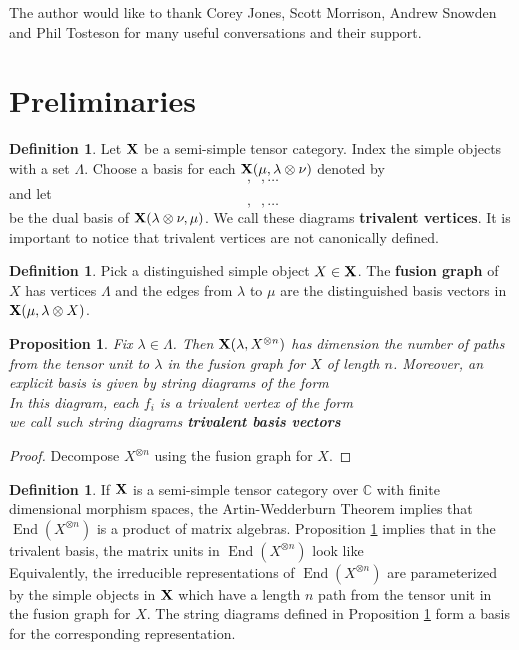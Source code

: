 \documentclass[12pt]{amsart}
\theoremstyle{plain}
\newtheorem{Proposition}[Theorem]{Proposition}
\theoremstyle{definition}
\newtheorem{Definition}[Theorem]{Definition}
\DeclareMathOperator{\End}{End}
\newcommand{\XX}{{\bf X}}
\begin{document}
The author would like to thank Corey Jones, Scott Morrison, Andrew Snowden and Phil Tosteson for many useful conversations and their support.



\section{Preliminaries} \label{sec:Preliminaries}

\begin{Definition} \label{def:tree_string_diagrams}
 Let $\XX$ be a semi-simple tensor category. Index the simple objects with a set $\Lambda$. Choose a basis for each $\XX(\mu,\lambda \otimes \nu)$ denoted by
\[
 \; , \;
 \; , \dots
\]
\noindent and let
\[
 \; , \;
 \; , \dots
\]
\noindent be the dual basis of $\XX(\lambda \otimes \nu,\mu)$. We call these diagrams {\bf trivalent vertices}. It is important to notice that trivalent vertices are not canonically defined.
\end{Definition}

\begin{Definition} \label{def:fusion_graph}
Pick a distinguished simple object $X \in \XX$. The {\bf fusion graph} of $X$ has vertices $\Lambda$ and the edges from $\lambda$ to $\mu$ are the distinguished basis vectors in $\XX(\mu,\lambda \otimes X)$.
\end{Definition}

\begin{Proposition} \label{prop:hom_space_tree_basis}
Fix $\lambda \in \Lambda$. Then $\XX(\lambda,X^{\otimes n})$ has dimension the number of paths from the tensor unit to $\lambda$ in the fusion graph for $X$ of length $n$. Moreover, an explicit basis is given by string diagrams of the form
\[

\]
\noindent In this diagram, each $f_i$ is a trivalent vertex of the form
\[

\]
\noindent we call such string diagrams {\bf trivalent basis vectors}
\end{Proposition}
\begin{proof}
Decompose $X^{\otimes n}$ using the fusion graph for $X$.
\end{proof}
\begin{Definition} \label{def:matrix_units}
If $\XX$ is a semi-simple tensor category over $\mathbb{C}$ with finite dimensional morphism spaces, the Artin-Wedderburn Theorem implies that $\End(X^{\otimes n})$ is a product of matrix algebras. Proposition \ref{prop:hom_space_tree_basis} implies that in the trivalent basis, the matrix units in  $\End(X^{\otimes n})$ look like
\[

\]
\noindent Equivalently, the irreducible representations of $\End(X^{\otimes n})$ are parameterized by the simple objects in $\XX$ which have a length $n$ path from the tensor unit in the fusion graph for $X$. The string diagrams defined in Proposition \ref{prop:hom_space_tree_basis} form a basis for the corresponding representation.
\end{Definition}
\end{document}

